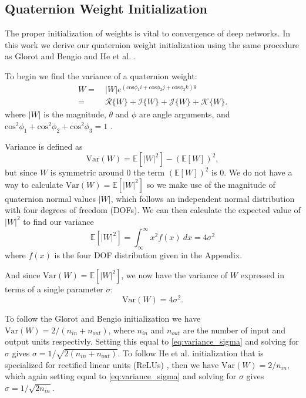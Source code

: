 \subsection{Quaternion Weight Initialization}
The proper initialization of weights is vital to convergence of deep networks. 
In this work we derive our quaternion weight initialization using the same procedure as Glorot and Bengio \cite{glorot2010understanding} and He et al. \cite{he2015delving}.

To begin we find the variance of a quaternion weight:
\begin{align}
W = &~|W|e^{(\mbox{cos}\phi_1 \textit{i} + \mbox{cos}\phi_2 \textit{j} + \mbox{cos}\phi_3 \textit{k})\theta} \nonumber \\
= &~\mathscr{R}\{W\} + \mathscr{I}\{W\} + \mathscr{J}\{W\} + \mathscr{K}\{W\}.
\label{eq:quaternion_weight}
\end{align}
where $|W|$ is the magnitude, $\theta$ and $\phi$ are angle arguments, and $\mbox{cos}^2\phi_1 + \mbox{cos}^2\phi_2 + \mbox{cos}^2\phi_3 = 1$ \cite{turner2002}.

Variance is defined as
\begin{equation}
\mbox{Var}(W) = \mathbb{E}[|W|^2] - (\mathbb{E}[W])^2,
\label{eq:variance}
\end{equation}
but since $W$ is symmetric around 0 the term $(\mathbb{E}[W])^2$ is 0. 
We do not have a way to calculate $\mbox{Var}(W) = \mathbb{E}[|W|^2]$ so we make use of the magnitude of quaternion normal values $|W|$, which follows an independent normal distribution with four degrees of freedom (DOFs).
We can then calculate the expected value of $|W|^2$ to find our variance
\begin{equation}
\mathbb{E}[|W|^2] = \int_\infty^\infty x^2 f(x) ~dx = 4\sigma^2
\label{eq:expected}
\end{equation}
where $f(x)$ is the four DOF distribution given in the Appendix.

And since $\mbox{Var}(W) = \mathbb{E}[|W|^2]$, we now have the variance of $W$ expressed in terms of a single parameter $\sigma$:
\begin{equation}
\mbox{Var}(W) = 4\sigma^2.
\label{eq:variance_sigma}
\end{equation}

To follow the Glorot and Bengio \cite{glorot2010understanding} initialization we have $\mbox{Var}(W) = 2/(n_{in}+n_{out})$, where $n_{in}$ and $n_{out}$ are the number of input and output units respectivly. 
Setting this equal to \eqref{eq:variance_sigma} and solving for $\sigma$ gives $\sigma = 1/\sqrt{2(n_{in}+n_{out})}$.
To follow He et al. \cite{he2015delving} initialization that is specialized for rectified linear units (ReLUs) \cite{nair2010rectified}, then we have $\mbox{Var}(W) = 2/n_{in}$, which again setting equal to \eqref{eq:variance_sigma} and solving for $\sigma$ gives $\sigma = 1/\sqrt{2n_{in}}$.

